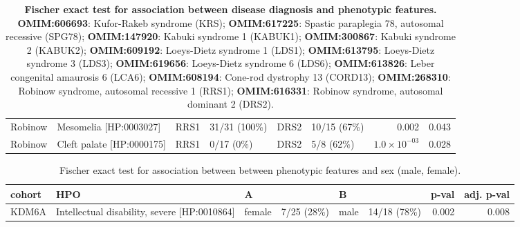 \documentclass[12pt]{article}
\begin{document}
\begin{table}
\begin{scriptsize}
\begin{tabular}{l>{\raggedright}p{2.5cm}llllrr}
Robinow & Mesomelia [HP:0003027] & RRS1 & 31/31 (100\%) & DRS2 & 10/15 (67\%) & 0.002 & 0.043\\
Robinow & Cleft palate [HP:0000175] & RRS1 & 0/17 (0\%) & DRS2 & 5/8 (62\%) & $1.0 \times 10^{-03}$ & 0.028\\
\bottomrule
\end{tabular}
\end{scriptsize}
\caption{\textbf{Fischer exact test for association between disease diagnosis and phenotypic features.}
\textbf{OMIM:606693}: Kufor-Rakeb syndrome (KRS);
 \textbf{OMIM:617225}: Spastic paraplegia 78, autosomal recessive (SPG78);
 \textbf{OMIM:147920}: Kabuki syndrome 1 (KABUK1);
 \textbf{OMIM:300867}: Kabuki syndrome 2 (KABUK2);
 \textbf{OMIM:609192}: Loeys-Dietz syndrome 1 (LDS1);
 \textbf{OMIM:613795}:  Loeys-Dietz syndrome 3 (LDS3);
 \textbf{OMIM:619656}: Loeys-Dietz syndrome 6 (LDS6);
 \textbf{OMIM:613826}: Leber congenital amaurosis 6 (LCA6);
 \textbf{OMIM:608194}:  Cone-rod dystrophy 13 (CORD13);
 \textbf{OMIM:268310}: Robinow syndrome, autosomal recessive 1 (RRS1);
 \textbf{OMIM:616331}: Robinow syndrome, autosomal dominant 2 (DRS2).
}
\label{tab:to_do}
\end{table}



\clearpage
\newpage

\begin{table}
\centering
\begin{tabular}{l>{\raggedright}p{4cm}lp{1.5cm}lp{1.5cm}rr}
\toprule
\textbf{cohort} & \textbf{HPO} & \textbf{A} & \textbf{} & \textbf{B} & \textbf{} & \textbf{p-val} & \textbf{adj. p-val}\\
\midrule
KDM6A & Intellectual disability, severe [HP:0010864] & female & 7/25 (28\%) & male & 14/18 (78\%) & 0.002 & 0.008\\
\bottomrule
\end{tabular}
\caption{Fischer exact test for association between  between phenotypic features and sex (male, female).}
\label{tab:mf_hpo}
\end{table}

\clearpage
\newpage
\end{document}
